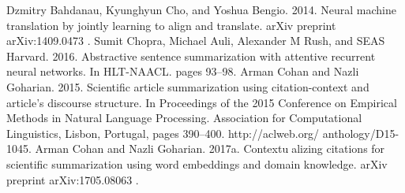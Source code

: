 \documentclass[aps,floatfix,prd,showpacs,twocolumn]{revtex4}
\begin{document}
\begin{thebibliography}
Dzmitry Bahdanau, Kyunghyun Cho, and Yoshua Bengio. 2014. Neural machine translation by jointly
learning to align and translate. arXiv preprint
arXiv:1409.0473 .
Sumit Chopra, Michael Auli, Alexander M Rush, and
SEAS Harvard. 2016. Abstractive sentence summarization with attentive recurrent neural networks. In
HLT-NAACL. pages 93–98.
Arman Cohan and Nazli Goharian. 2015. Scientific article summarization using citation-context
and article’s discourse structure. In Proceedings of the 2015 Conference on Empirical Methods in Natural Language Processing. Association for Computational Linguistics, Lisbon, Portugal, pages 390–400. http://aclweb.org/
anthology/D15-1045.
Arman Cohan and Nazli Goharian. 2017a. Contextualizing citations for scientific summarization using
word embeddings and domain knowledge. arXiv
preprint arXiv:1705.08063 .

\end{thebibliography}
\end{document}
